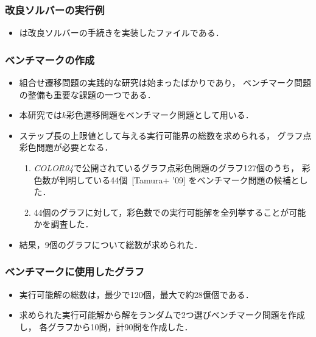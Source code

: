 \documentclass[dvipdfmx,11pt]{beamer}
\begin{document}
\begin{frame}\frametitle{改良ソルバーの実行例}

  \begin{exampleblock}{}
    \centering
    
  \end{exampleblock}

  \begin{itemize}
    \item {}は改良ソルバーの手続きを実装したファイルである．
  \end{itemize}

\end{frame}

\begin{frame}\frametitle{ベンチマークの作成}

  \begin{itemize}
    \item 組合せ遷移問題の実践的な研究は始まったばかりであり，
          ベンチマーク問題の整備も重要な課題の一つである．
    \item 本研究では$k$彩色遷移問題をベンチマーク問題として用いる．
    \item ステップ長の上限値として与える実行可能界の総数を求められる，
          グラフ点彩色問題が必要となる．
          \begin{enumerate}
            \item \textit{COLOR04}で公開されているグラフ点彩色問題のグラフ127個のうち，
                  彩色数が判明している44個~[Tamura+ '09] をベンチマーク問題の候補とした．
            \item 44個のグラフに対して，彩色数での実行可能解を全列挙することが可能
                  かを調査した．
          \end{enumerate}
    \item 結果，9個のグラフについて総数が求められた．
  \end{itemize}
  
\end{frame}

\begin{frame}\frametitle{ベンチマークに使用したグラフ}

  \begin{exampleblock}{}
    \centering
    
  \end{exampleblock}

  \begin{itemize}
  \item 実行可能解の総数は，最少で120個，最大で約28億個である．
  \item 求められた実行可能解から解をランダムで2つ選びベンチマーク問題を作成し，
        各グラフから10問，計90問を作成した．
  \end{itemize}

\end{frame}
\end{document}

